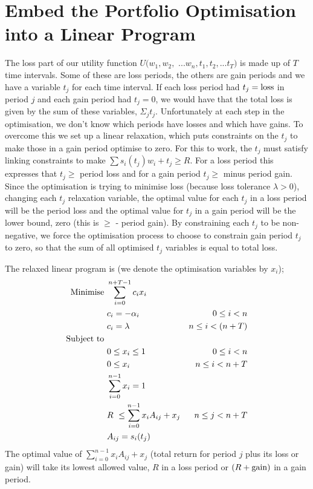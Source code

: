 \documentclass[12pt]{article}
\begin{document}
\section{Embed the Portfolio Optimisation into a Linear Program}
The loss part of our utility function $U(w_1,w_2,$ $...w_n,t_1,t_2,...t_T)$ is made up of $T$ time intervals. Some of these
are loss periods, the others are gain periods and we have a variable $t_j$ for each time interval. If each loss period had $t_j = {\rm loss}$ in period $j$ and each gain period had
$t_j=0$, we would have that the total loss is given by the sum of these variables, $\Sigma_j t_j$. Unfortunately at each step in the optimisation,
we don't know which periods have losses and which have gains. To overcome this we set up a linear relaxation, which puts constraints on the $t_j$ to make those in a gain period optimise to zero.
For this to work, the $t_j$ must satisfy
linking constraints to make $\sum s_i( t_j )w_i +t_j \ge R$. For a loss period this expresses that $t_j \ge$ period loss and for a gain period
$t_j \ge$ minus period gain. Since the optimisation is trying to minimise loss (because loss tolerance $\lambda > 0$), changing each $t_j$ relaxation variable, the optimal value 
for each $t_j$ in a loss period will be the period loss and the optimal value for $t_j$ in a gain period will be the lower bound, zero (this is $\ge$ - period gain).
By constraining each $t_j$ to be non-negative, we force the optimisation process to choose to constrain gain period 
$t_j$ to zero, so that the sum of all optimised $t_j$ variables is equal to total loss.

The relaxed linear program is (we denote the optimisation variables by $x_i$);
\begin{align*}
    {\rm Minimise}\ & \sum_{i=0}^{n+T-1} c_i x_i\cr
    &c_i=-\alpha_i &0\le i < n\cr
    &c_i =\lambda &n\le i < (n+T)\cr
    {\rm Subject\ to}\ &\cr& 0 \le x_i \le 1\ &0\le i < n\cr
    & 0 \le x_i \ &n\le i < n+T\cr
    & \sum_{i=0}^{n-1} x_i = 1\cr
    & R\ \le\sum_{i=0}^{n-1} x_i A_{ij} + x_j  &n\le j < n+T\cr
    & A_{ij} = s_i(t_j )\cr
\end{align*}
The optimal value of $\sum_{i=0}^{n-1} x_i A_{ij} + x_j$ (total return for period $j$ plus its loss or gain) will take its lowest allowed value, $R$ in a loss period or $(R+{\rm gain})$ in a gain period.
\end{document}

